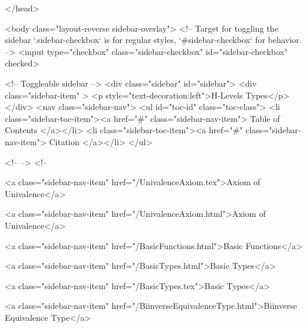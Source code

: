   
</head>




  <body class="layout-reverse sidebar-overlay">
    <!-- Target for toggling the sidebar `.sidebar-checkbox` is for regular
     styles, `#sidebar-checkbox` for behavior. -->
<input type="checkbox" class="sidebar-checkbox" id="sidebar-checkbox" checked>

<!-- Toggleable sidebar -->
<div class="sidebar" id="sidebar">
  <div class="sidebar-item" >
    <p style="text-decoration:left">H-Levels Types</p>
  </div>
  <nav class="sidebar-nav">
    <ul id="toc-id" class="toc-class">
  <li class="sidebar-toc-item"><a href="#" class="sidebar-nav-item"> Table of Contents </a></li>
  <li class="sidebar-toc-item"><a href="#" class="sidebar-nav-item"> Citation </a></li>
</ul>


    <!--  -->
    <!-- 
      
    
      
    
      
    
      
    
      
        
      
    
      
        
          <a class="sidebar-nav-item" href="/UnivalenceAxiom.tex">Axiom of Univalence</a>
        
      
    
      
        
          <a class="sidebar-nav-item" href="/UnivalenceAxiom.html">Axiom of Univalence</a>
        
      
    
      
        
          <a class="sidebar-nav-item" href="/BasicFunctions.html">Basic Functions</a>
        
      
    
      
        
          <a class="sidebar-nav-item" href="/BasicTypes.html">Basic Types</a>
        
      
    
      
        
          <a class="sidebar-nav-item" href="/BasicTypes.tex">Basic Types</a>
        
      
    
      
        
          <a class="sidebar-nav-item" href="/BiinverseEquivalenceType.html">Biinverse Equivalence Type</a>
        

